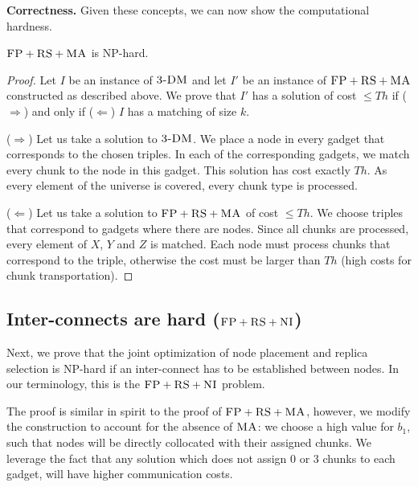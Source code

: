 \documentclass[preprint,12pt]{elsarticle}
\newcommand{\CC}{\textsc{NI}}
\newcommand{\FP}{\textsc{FP}}
\newcommand{\RS}{\textsc{RS}}
\newcommand{\MA}{\textsc{MA}}
\newcommand{\CostTrans}{\ensuremath{b_1}}
\newcommand{\TDM}{\textsc{3-DM}}
\newcommand{\Thr}{\ensuremath{Th}}
\begin{document}
\textbf{Correctness.}
Given these concepts, we can now show the computational hardness.
\begin{theorem}
$\FP+\RS+\MA$ is NP-hard.
\end{theorem}
\begin{proof}
Let $I$ be an instance of $\TDM$ and let $I'$ be an instance of
$\FP+\RS+\MA$ constructed as described above. We prove that $I'$ has a solution of cost $\leq \Thr$ if ($\Rightarrow$) and only if
($\Leftarrow$)
$I$ has a matching of size $k$.

($\Rightarrow$) Let us take a solution to $\TDM$. We place a node in every
gadget that corresponds to the chosen triples. In each of the corresponding
gadgets, we match every chunk to the node in this gadget. This
solution has
cost exactly $\Thr$. As every element of the universe is covered, every
chunk type is processed.

($\Leftarrow$) Let us take a solution to $\FP+\RS+\MA$ of cost $\leq \Thr$. We
choose triples that correspond to gadgets where there are nodes. Since
all chunks are processed, every element of $X$, $Y$ and $Z$ is matched. Each
node must process chunks that
correspond to the triple, otherwise the
cost must be larger than $\Thr$ (high costs for chunk
transportation).
\end{proof}


\subsection{Inter-connects are hard ($\FP+\RS+\CC$)}\label{ssec:fprscc}


Next, we prove that the joint optimization of node placement and replica selection
is NP-hard if an inter-connect has to be established between nodes.
In our terminology, this is the $\FP+\RS+\CC$ problem.

The proof is similar in spirit to the proof of $\FP+\RS+\MA$, however,
we modify the construction to account for the absence of $\MA$:
we choose
a high value for $\CostTrans$, such that nodes will be directly collocated with
their assigned chunks. We leverage the fact that any solution which does not
assign 0 or 3 chunks to each gadget, will have higher communication costs.
\end{document}
